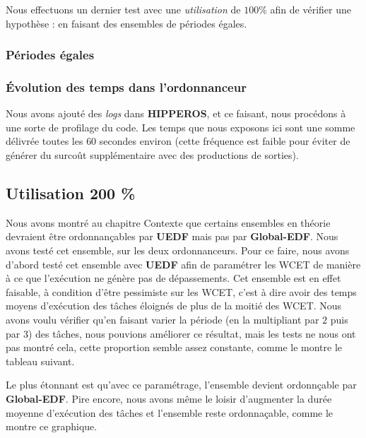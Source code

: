 	Nous effectuons un dernier test avec une \textit{utilisation }de $100\%$ afin 
	de vérifier une hypothèse : en faisant des ensembles de périodes égales.
	
	\subsubsection{Périodes égales}
	
	\subsubsection{Évolution des temps dans l'ordonnanceur}
	
	Nous avons ajouté des \textit{logs} dans \textbf{HIPPEROS}, et ce faisant, nous procédons à une sorte de 
	profilage du code. Les temps que nous exposons ici sont une somme délivrée toutes les $60$ secondes environ 
	(cette fréquence est faible pour éviter de générer du surcoût supplémentaire avec des productions de sorties).
	
	
	\subsection{Utilisation 200 \%}
	
	Nous avons montré au chapitre Contexte que certains ensembles en théorie devraient être 
	ordonnançables par \textbf{UEDF }mais pas par\textbf{ Global-EDF}. Nous avons testé cet ensemble, sur les deux 
	ordonnanceurs. Pour ce faire, nous avons d'abord testé cet ensemble avec \textbf{UEDF }afin de paramétrer les WCET 
	de manière à ce que l'exécution ne génère pas de dépassements. Cet ensemble est en effet faisable, à condition 
	d'être pessimiste sur les WCET, c'est à dire avoir des temps moyens d'exécution des tâches éloignés de plus de la 
	moitié des WCET. \newline
	Nous avons voulu vérifier qu'en faisant varier la période (en la multipliant par $2$ puis par $3$) des tâches, 
	nous pouvions améliorer ce résultat, mais les tests ne nous ont pas montré cela, cette proportion semble 
	assez constante, comme le montre le tableau suivant. \newline
	
	
	Le plus étonnant est qu'avec ce paramétrage, l'ensemble devient ordonnçable par \textbf{Global-EDF}. 
	Pire encore, nous avons même le loisir d'augmenter la durée moyenne d'exécution des tâches et 
	l'ensemble reste ordonnaçable, comme le montre ce graphique. \newline
	
